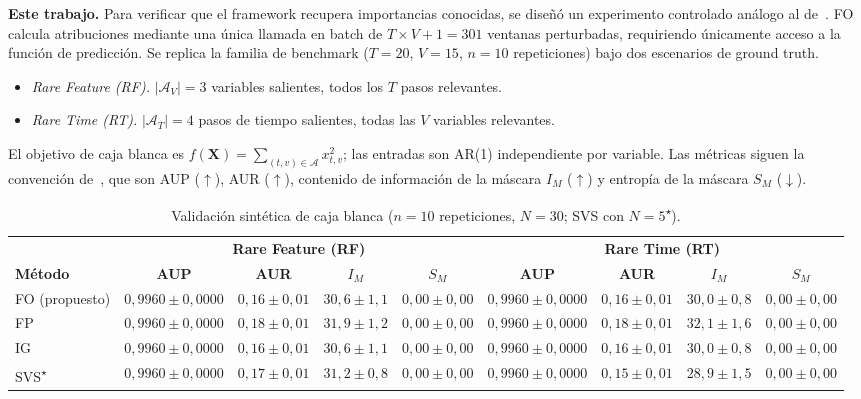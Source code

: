 \documentclass[conference, letterpaper]{IEEEtran}
\begin{document}
\textbf{Este trabajo.}
Para verificar que el framework recupera importancias conocidas, se
diseñó un experimento controlado análogo al de~\cite{crabbe2021}.
FO calcula atribuciones mediante una única llamada en batch de
$T{\times}V{+}1{=}301$ ventanas perturbadas, requiriendo únicamente
acceso a la función de predicción. Se replica la familia de benchmark
($T{=}20$, $V{=}15$, $n{=}10$ repeticiones) bajo dos escenarios
de ground truth.

\begin{itemize}
  \item \textit{Rare Feature (RF).} $|\mathcal{A}_V|{=}3$ variables
    salientes, todos los $T$ pasos relevantes.
  \item \textit{Rare Time (RT).} $|\mathcal{A}_T|{=}4$ pasos de
    tiempo salientes, todas las $V$ variables relevantes.
\end{itemize}

El objetivo de caja blanca es $f(\mathbf{X}) = \sum_{(t,v)\in\mathcal{A}}
x_{t,v}^{2}$; las entradas son AR(1) independiente por variable.
Las métricas siguen la convención de~\cite{crabbe2021}, que son AUP
($\uparrow$), AUR ($\uparrow$), contenido de información de la
máscara $I_M$ ($\uparrow$) y entropía de la máscara $S_M$
($\downarrow$).

\begin{table}[ht]
\centering
\caption{Validación sintética de caja blanca ($n{=}10$ repeticiones,
         $N{=}30$; SVS con $N{=}5$\textsuperscript{$\star$}).}
\label{tab:exp1_synthetic}
\scriptsize
\setlength{\tabcolsep}{4pt}
\begin{tabular}{lcccccccc}
\toprule
& \multicolumn{4}{c}{\textbf{Rare Feature (RF)}}
& \multicolumn{4}{c}{\textbf{Rare Time (RT)}} \\
\cmidrule(lr){2-5}\cmidrule(lr){6-9}
\textbf{Método} & \textbf{AUP} & \textbf{AUR}
  & $I_M$ & $S_M$
  & \textbf{AUP} & \textbf{AUR}
  & $I_M$ & $S_M$ \\
\midrule
FO (propuesto)
  & $0{,}9960{\pm}0{,}0000$ & $0{,}16{\pm}0{,}01$ & $30{,}6{\pm}1{,}1$ & $0{,}00{\pm}0{,}00$
  & $0{,}9960{\pm}0{,}0000$ & $0{,}16{\pm}0{,}01$ & $30{,}0{\pm}0{,}8$ & $0{,}00{\pm}0{,}00$ \\
FP
  & $0{,}9960{\pm}0{,}0000$ & $0{,}18{\pm}0{,}01$ & $31{,}9{\pm}1{,}2$ & $0{,}00{\pm}0{,}00$
  & $0{,}9960{\pm}0{,}0000$ & $0{,}18{\pm}0{,}01$ & $32{,}1{\pm}1{,}6$ & $0{,}00{\pm}0{,}00$ \\
IG
  & $0{,}9960{\pm}0{,}0000$ & $0{,}16{\pm}0{,}01$ & $30{,}6{\pm}1{,}1$ & $0{,}00{\pm}0{,}00$
  & $0{,}9960{\pm}0{,}0000$ & $0{,}16{\pm}0{,}01$ & $30{,}0{\pm}0{,}8$ & $0{,}00{\pm}0{,}00$ \\
SVS\textsuperscript{$\star$}
  & $0{,}9960{\pm}0{,}0000$ & $0{,}17{\pm}0{,}01$ & $31{,}2{\pm}0{,}8$ & $0{,}00{\pm}0{,}00$
  & $0{,}9960{\pm}0{,}0000$ & $0{,}15{\pm}0{,}01$ & $28{,}9{\pm}1{,}5$ & $0{,}00{\pm}0{,}00$ \\
\bottomrule
\end{tabular}
\end{table}
\end{document}
